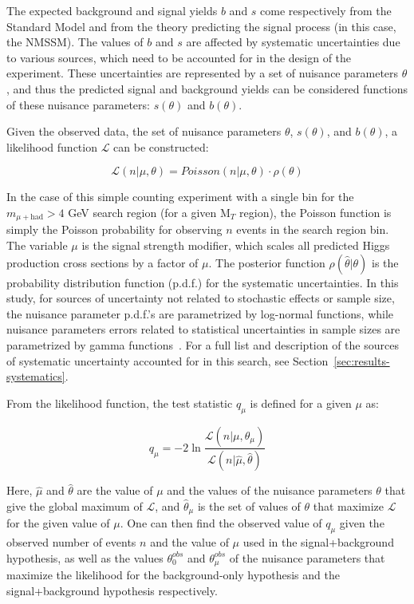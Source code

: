 The expected background and signal yields $b$ and $s$ come respectively from the Standard Model and from the theory predicting the signal process (in this case, the NMSSM). The values of $b$ and $s$ are affected by systematic uncertainties due to various sources, which need to be accounted for in the design of the experiment. These uncertainties are represented by a set of nuisance parameters $\theta$, and thus the predicted signal and background yields can be considered functions of these nuisance parameters: $s(\theta)$ and $b(\theta)$.

Given the observed data, the set of nuisance parameters $\theta$, $s(\theta)$, and $b(\theta)$, a likelihood function $\mathcal{L}$ can be constructed:

\begin{equation}
\mathcal{L}(n \vert \mu,\theta) = Poisson(n \vert \mu,\theta) \cdot \rho(\theta)
\label{eq:likelihood}
\end{equation}

In the case of this simple counting experiment with a single bin for the $m_{\mu+\text{had}} > 4$ GeV search region (for a given M$_T$ region), the Poisson function is simply the Poisson probability for observing $n$ events in the search region bin. The variable $\mu$ is the signal strength modifier, which scales all predicted Higgs production cross sections by a factor of $\mu$. The posterior function $\rho(\hat{\theta} \vert \theta)$ is the probability distribution function (p.d.f.) for the systematic uncertainties. In this study, for sources of uncertainty not related to stochastic effects or sample size, the nuisance parameter p.d.f.'s are parametrized by log-normal functions, while nuisance parameters errors related to statistical uncertainties in sample sizes are parametrized by gamma functions~\cite{CombinedTwiki}. For a full list and description of the sources of systematic uncertainty accounted for in this search, see Section~\ref{sec:results-systematics}.

From the likelihood function, the test statistic $q_{\mu}$ is defined for a given $\mu$ as:

\begin{equation}
q_{\mu} = -2\ln\frac{\mathcal{L}(n \vert \mu,\hat{\theta}_{\mu})}{\mathcal{L}(n \vert \hat{\mu},\hat{\theta})}
\label{eq:test-statistic}
\end{equation}

Here, $\hat{\mu}$ and $\hat{\theta}$ are the value of $\mu$ and the values of the nuisance parameters $\theta$ that give the global maximum of $\mathcal{L}$, and $\hat{\theta}_{\mu}$ is the set of values of $\theta$ that maximize $\mathcal{L}$ for the given value of $\mu$. One can then find the observed value of $q_{\mu}$ given the observed number of events $n$ and the value of $\mu$ used in the signal+background hypothesis, as well as the values $\theta^{obs}_{0}$ and $\theta^{obs}_{\mu}$ of the nuisance parameters that maximize the likelihood for the background-only hypothesis and the signal+background hypothesis respectively.

